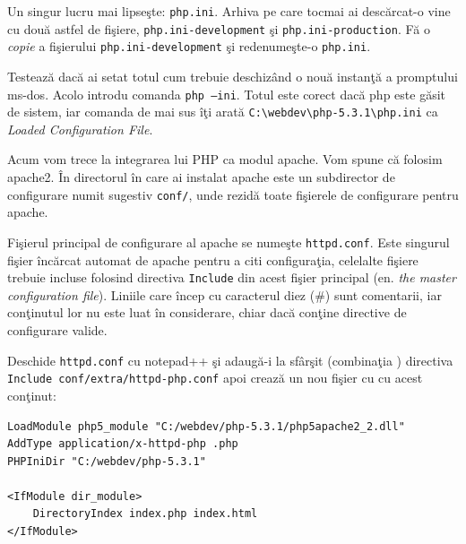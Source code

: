 
Un singur lucru mai lipseşte: \texttt{php.ini}. Arhiva pe care tocmai
ai descărcat-o vine cu două astfel de fişiere, \texttt{php.ini-development} şi
\texttt{php.ini-production}. Fă o \textit{copie} a fişierului
\texttt{php.ini-development} şi redenumeşte-o \texttt{php.ini}.

Testează dacă ai setat totul cum trebuie deschizând o nouă instanţă
a promptului ms-dos.
Acolo introdu comanda \texttt{php --ini}.
Totul este corect dacă php este găsit de sistem, iar comanda de mai sus îţi
arată \texttt{C:{\textbackslash}webdev{\textbackslash}php-5.3.1{\textbackslash}php.ini}
ca \textit{Loaded Configuration File}.


\vspace{1em}

Acum vom trece la integrarea lui PHP ca modul apache. Vom spune că folosim
apache2. În directorul în care ai instalat apache este un subdirector de configurare
numit sugestiv \texttt{conf/}, unde rezidă toate fişierele de configurare
pentru apache.

Fişierul principal de configurare  al apache se numeşte \texttt{httpd.conf}. Este singurul
fişier încărcat automat de apache pentru a citi configuraţia, celelalte fişiere
trebuie incluse folosind directiva \texttt{Include} din acest fişier
principal (en. \textsl{the master configuration file}). Liniile care încep
cu caracterul diez (\#) sunt comentarii, iar conţinutul lor nu este luat
în considerare, chiar dacă conţine directive de configurare valide.

Deschide \texttt{httpd.conf} cu notepad++ şi adaugă-i la sfârşit
(combinaţia ) directiva
\texttt{Include conf/extra/httpd-php.conf}
apoi crează un nou fişier cu  cu acest conţinut:
\begin{verbatim}
LoadModule php5_module "C:/webdev/php-5.3.1/php5apache2_2.dll"
AddType application/x-httpd-php .php
PHPIniDir "C:/webdev/php-5.3.1"

<IfModule dir_module>
    DirectoryIndex index.php index.html
</IfModule>
\end{verbatim}

